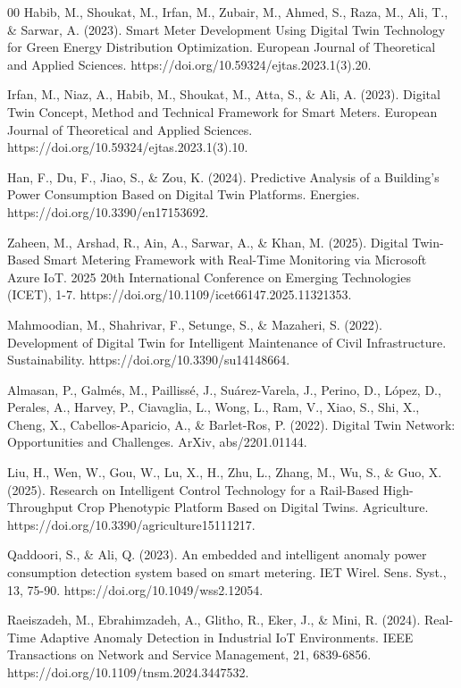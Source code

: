 \documentclass[journal]{IEEEtran}
\begin{document}
\begin{thebibliography}{00}
 Habib, M., Shoukat, M., Irfan, M., Zubair, M., Ahmed, S., Raza, M., Ali, T., \& Sarwar, A. (2023). Smart Meter Development Using Digital Twin Technology for Green Energy Distribution Optimization. European Journal of Theoretical and Applied Sciences. https://doi.org/10.59324/ejtas.2023.1(3).20.

 Irfan, M., Niaz, A., Habib, M., Shoukat, M., Atta, S., \& Ali, A. (2023). Digital Twin Concept, Method and Technical Framework for Smart Meters. European Journal of Theoretical and Applied Sciences. https://doi.org/10.59324/ejtas.2023.1(3).10.

 Han, F., Du, F., Jiao, S., \& Zou, K. (2024). Predictive Analysis of a Building’s Power Consumption Based on Digital Twin Platforms. Energies. https://doi.org/10.3390/en17153692.

 Zaheen, M., Arshad, R., Ain, A., Sarwar, A., \& Khan, M. (2025). Digital Twin-Based Smart Metering Framework with Real-Time Monitoring via Microsoft Azure IoT. 2025 20th International Conference on Emerging Technologies (ICET), 1-7. https://doi.org/10.1109/icet66147.2025.11321353.

 Mahmoodian, M., Shahrivar, F., Setunge, S., \& Mazaheri, S. (2022). Development of Digital Twin for Intelligent Maintenance of Civil Infrastructure. Sustainability. https://doi.org/10.3390/su14148664.

 Almasan, P., Galmés, M., Paillissé, J., Suárez-Varela, J., Perino, D., López, D., Perales, A., Harvey, P., Ciavaglia, L., Wong, L., Ram, V., Xiao, S., Shi, X., Cheng, X., Cabellos-Aparicio, A., \& Barlet-Ros, P. (2022). Digital Twin Network: Opportunities and Challenges. ArXiv, abs/2201.01144.

 Liu, H., Wen, W., Gou, W., Lu, X., H., Zhu, L., Zhang, M., Wu, S., \& Guo, X. (2025). Research on Intelligent Control Technology for a Rail-Based High-Throughput Crop Phenotypic Platform Based on Digital Twins. Agriculture. https://doi.org/10.3390/agriculture15111217.

 Qaddoori, S., \& Ali, Q. (2023). An embedded and intelligent anomaly power consumption detection system based on smart metering. IET Wirel. Sens. Syst., 13, 75-90. https://doi.org/10.1049/wss2.12054.

 Raeiszadeh, M., Ebrahimzadeh, A., Glitho, R., Eker, J., \& Mini, R. (2024). Real-Time Adaptive Anomaly Detection in Industrial IoT Environments. IEEE Transactions on Network and Service Management, 21, 6839-6856. https://doi.org/10.1109/tnsm.2024.3447532.


\end{thebibliography}
\end{document}
